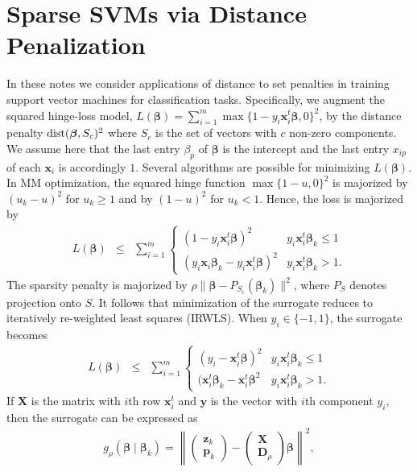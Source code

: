 \documentclass[11pt]{article}
\def\dist{\mathop{\rm dist}\nolimits}
\newcommand{\bp}{\boldsymbol{p}}
\newcommand{\bx}{\boldsymbol{x}}
\newcommand{\by}{\boldsymbol{y}}
\newcommand{\bz}{\boldsymbol{z}}
\newcommand{\bD}{\boldsymbol{D}}
\newcommand{\bX}{\boldsymbol{X}}
\newcommand{\bbeta}{\boldsymbol{\beta}}
\begin{document}
\section*{\center Sparse SVMs via Distance Penalization}

In these notes we consider applications of distance to set penalties in training support vector machines for classification tasks.
Specifically, we augment the squared hinge-loss model, $L(\bbeta)=\sum_{i=1}^m \max\{1-y_i \bx_i^t\bbeta,0\}^2$, by the distance penalty $\dist(\bbeta, S_{c})^{2}$ where $S_{c}$ is the set of vectors with $c$ non-zero components.
We assume here that the last entry $\beta_p$ of $\bbeta$ is the intercept and the last entry $x_{ip}$ of each $\bx_i$ is accordingly $1$.
Several algorithms are possible for minimizing $L(\bbeta)$.
In MM optimization, the squared hinge function $\max\{1-u,0\}^2$ is majorized by $(u_k-u)^2$ for $u_k \ge 1$ and by $(1-u)^2$ for $u_k < 1$.
Hence, the loss is majorized by
\begin{eqnarray*}
L(\bbeta) & \le & \sum_{i=1}^m
\begin{cases} (1-y_i \bx_i^t \bbeta)^2 & y_i \bx_i^t \bbeta_k \le 1 \\
(y_i \bx_i\bbeta_k - y_i \bx_i^t \bbeta)^2 & y_i \bx_i^t \bbeta_k > 1 .\end{cases}
\end{eqnarray*} 
The sparsity penalty is majorized by $\rho \|\bbeta-P_{S_{c}}(\bbeta_k)\|^2$, where $P_{S}$ denotes projection onto $S$. It follows that minimization of the surrogate reduces to iteratively re-weighted least squares (IRWLS). When $y_i \in \{-1,1\}$, the surrogate becomes
\begin{eqnarray*}
L(\bbeta) & \le & \sum_{i=1}^m
\begin{cases} (y_i - \bx_i^t \bbeta)^2 & y_i \bx_i^t \bbeta_k \le 1 \\
(\bx_i^t \bbeta_k - \bx_i^t \bbeta^2 & y_i \bx_i^t \bbeta_k > 1 . \end{cases}
\end{eqnarray*}
If $\bX$ is the matrix with $i$th row $\bx_i^t$ and $\by$ is the vector with $i$th component $y_i$, then the surrogate can be expressed as
\begin{eqnarray*}
g_{\rho}(\bbeta \mid \bbeta_{k})
=
\left\|\begin{pmatrix}\bz_k \\\bp_{k} \end{pmatrix}-
\begin{pmatrix} \bX \\ \bD_{\rho}\end{pmatrix}\bbeta
\right\|^2,
\end{eqnarray*}
\end{document}
